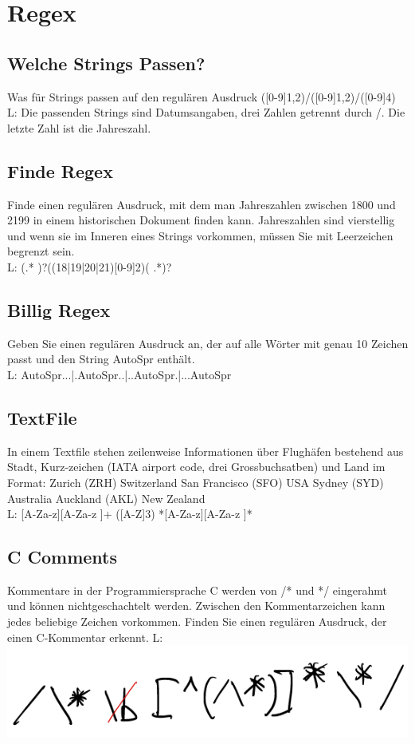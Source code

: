 \section{Regex}
\subsection{Welche Strings Passen?}
Was für Strings passen auf den regulären Ausdruck ([0-9]{1,2})/([0-9]{1,2})/([0-9]{4}) \\
L: Die passenden Strings sind Datumsangaben, drei Zahlen getrennt durch /. Die letzte
Zahl ist die Jahreszahl.
\subsection{Finde Regex}
Finde einen regulären Ausdruck, mit dem man Jahreszahlen zwischen 1800 und 2199 in einem historischen Dokument finden kann. Jahreszahlen sind vierstellig und wenn sie im Inneren eines Strings vorkommen, müssen Sie mit Leerzeichen begrenzt sein. \\
L: (.* )?((18|19|20|21)[0-9]{2})( .*)?

\subsection{Billig Regex}
Geben Sie einen regulären Ausdruck an, der auf alle Wörter mit genau 10 Zeichen passt und den String AutoSpr enthält. \\
L: AutoSpr...|.AutoSpr..|..AutoSpr.|...AutoSpr

\subsection{TextFile}
In einem Textfile stehen zeilenweise Informationen über Flughäfen bestehend aus Stadt, Kurz-zeichen (IATA airport code, drei Grossbuchsatben) und Land im Format:
Zurich (ZRH) Switzerland
San Francisco (SFO) USA
Sydney (SYD) Australia
Auckland (AKL) New Zealand \\
L: [A-Za-z][A-Za-z ]+ ([A-Z]{3}) *[A-Za-z][A-Za-z ]*
\subsection{C Comments}
Kommentare in der Programmiersprache C werden von /* und */ eingerahmt und können nichtgeschachtelt werden. Zwischen den Kommentarzeichen kann jedes beliebige Zeichen vorkommen. Finden Sie einen regulären Ausdruck, der einen C-Kommentar erkennt.
L: \includegraphics[width=\columnwidth]{img/cregex.png}


